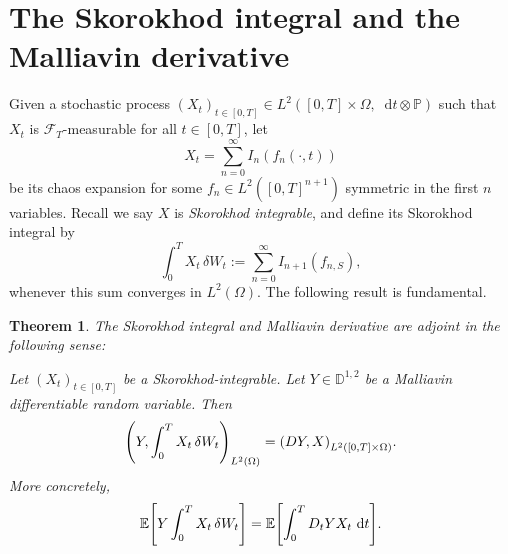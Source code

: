\documentclass[11pt, a4paper, twoside]{book}
\theoremstyle{plain}
\newtheorem{theorem}{Theorem}
\theoremstyle{definition}
\theoremstyle{remark}
\renewcommand{\d}{\mathop{}\!\mathrm{d}}
\newcommand{\bbD}{\mathbb{D}}
\newcommand{\bbE}{\mathbb{E}}
\newcommand{\bbP}{\mathbb{P}}
\newcommand{\scrF}{\mathscr{F}}
\DeclarePairedDelimiter{\parens}{\lparen}{\rparen}
\DeclarePairedDelimiter{\brackets}{\lbrack}{\rbrack}
\begin{document}
\section{The Skorokhod integral and the Malliavin derivative}
Given a stochastic process $(X_t)_{t \in [0, T]} \in L^2([0,T]\times\Omega,
	\d{t}\otimes\bbP)$ such that $X_t$ is $\scrF_T$-measurable for all $t \in
	[0, T]$, let
\[
	X_t = \sum_{n = 0}^\infty I_n(f_n(\cdot, t))
\]
be its chaos expansion for some $f_n \in L^2([0, T]^{n + 1})$ symmetric in the
first $n$ variables. Recall we say $X$ is \emph{Skorokhod integrable}, and
define its Skorokhod integral by
\[
	\int_0^T X_t \, \delta{W}_t := \sum_{n = 0}^\infty I_{n + 1}({f}_{n,S}),
\]
whenever this sum converges in $L^2(\Omega)$. The following result is
fundamental.

\begin{theorem}
	The Skorokhod integral and Malliavin derivative are \emph{adjoint} in the
	following sense:

	Let $(X_t)_{t \in [0, T]}$ be a Skorokhod-integrable. Let $Y \in \bbD^{1,
			2}$ be a Malliavin differentiable random variable. Then
	\[
		\parens*{
			Y, \int_0^T X_t \, \delta{W}_t
		}_{L^2(\Omega)}
		= \parens*{
			D{Y}, X
		}_{L^2([0,T]\times\Omega)}.
	\]
	More concretely,
	\[
		\bbE\brackets*{
			Y \int_0^T X_t \, \delta{W}_t
		}
		= \bbE\brackets*{
			\int_0^T
			D_t Y X_t
			\, \d{t}
		}.
	\]
\end{theorem}
\end{document}
